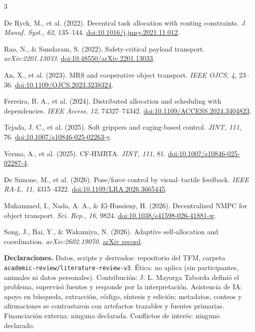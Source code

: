 \documentclass[10pt,letterpaper]{article}
\newcommand{\boxtext}[2]{\colorbox{#1}{\parbox{\dimexpr\linewidth-2\fboxsep\relax}{\fontsize{7.8}{8.55}\selectfont #2}}}
\begin{document}
\begin{multicols}{3}
\begin{enumerate}[label={[\arabic*]},leftmargin=3.6mm]
\item De Ryck, M., et al. (2022). Decentral task allocation with routing constraints. \emph{J. Manuf. Syst., 62}, 135--144. \href{https://doi.org/10.1016/j.jmsy.2021.11.012}{doi:10.1016/j.jmsy.2021.11.012}.
\item Rao, N., \& Sundaram, S. (2022). Safety-critical payload transport. \emph{arXiv:2201.13033}. \href{https://doi.org/10.48550/arXiv.2201.13033}{doi:10.48550/arXiv.2201.13033}.
\item An, X., et al. (2023). MRS and cooperative object transport. \emph{IEEE OJCS, 4}, 23--36. \href{https://doi.org/10.1109/OJCS.2023.3238324}{doi:10.1109/OJCS.2023.3238324}.
\item Ferreira, B. A., et al. (2024). Distributed allocation and scheduling with dependencies. \emph{IEEE Access, 12}, 74327--74342. \href{https://doi.org/10.1109/ACCESS.2024.3404823}{doi:10.1109/ACCESS.2024.3404823}.
\item Tejada, J. C., et al. (2025). Soft grippers and caging-based control. \emph{JINT, 111}, 76. \href{https://doi.org/10.1007/s10846-025-02263-y}{doi:10.1007/s10846-025-02263-y}.
\item Verma, A., et al. (2025). CF-HMRTA. \emph{JINT, 111}, 81. \href{https://doi.org/10.1007/s10846-025-02287-4}{doi:10.1007/s10846-025-02287-4}.
\item De Simone, M., et al. (2026). Pose/force control by visual--tactile feedback. \emph{IEEE RA-L, 11}, 4315--4322. \href{https://doi.org/10.1109/LRA.2026.3665445}{doi:10.1109/LRA.2026.3665445}.
\item Muhammed, I., Nada, A. A., \& El-Hussieny, H. (2026). Decentralized NMPC for object transport. \emph{Sci. Rep., 16}, 9824. \href{https://doi.org/10.1038/s41598-026-41881-w}{doi:10.1038/s41598-026-41881-w}.
\item Song, J., Bai, Y., \& Wakamiya, N. (2026). Adaptive self-allocation and coordination. \emph{arXiv:2602.19070}. \href{https://arxiv.org/abs/2602.19070}{arXiv record}.
\end{enumerate}
\end{multicols}

\vspace{.3mm}
\boxtext{soft}{\fontsize{6.2}{6.75}\selectfont\textbf{Declaraciones.} Datos, scripts y derivados: repositorio del TFM, carpeta \texttt{academic-review/literature-review-v3}. Ética: no aplica (sin participantes, animales ni datos personales). Contribución: J. L. Mayorga Taborda definió el problema, supervisó fuentes y responde por la interpretación. Asistencia de IA: apoyo en búsqueda, extracción, código, síntesis y edición; metadatos, conteos y afirmaciones se contrastaron con artefactos trazables y fuentes primarias. Financiación externa: ninguna declarada. Conflictos de interés: ninguno declarado.}
\end{document}
